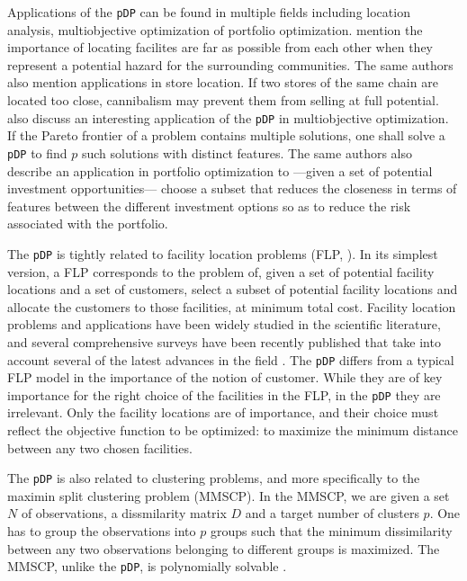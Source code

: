 \documentclass[a4paper,10pt]{article}
\newcommand{\pDP}{\texttt{pDP}}
\begin{document}
Applications of the \pDP{} can be found in multiple fields including location analysis, multiobjective optimization of portfolio optimization. \citet{Kuby1987Programming} mention the importance of locating facilites are far as possible from each other when they represent a potential hazard for the surrounding communities. The same authors also mention applications in store location. If two stores of the same chain are located too close, cannibalism may prevent them from selling at full potential. \citet{Saboonchi2014MaxMinMin} also discuss an interesting application of the \pDP{} in multiobjective optimization. If the Pareto frontier of a problem contains multiple solutions, one shall solve a \pDP{} to find $p$ such solutions with distinct features. The same authors also describe an application in portfolio optimization to ---given a set of potential investment opportunities--- choose a subset that reduces the closeness in terms of features between the different investment options so as to reduce the risk associated with the portfolio. 

The \pDP{} is tightly related to facility location problems (FLP, \citet{Laporte2015Location}). In its simplest version, a FLP corresponds to the problem of, given a set of potential facility locations and a set of customers, select a subset of potential facility locations and allocate the customers to those facilities, at minimum total cost. Facility location problems and applications have been widely studied in the scientific literature, and several comprehensive surveys have been recently published that take into account several of the latest advances in the field \citep{Laporte2015Location, Melo2009Facility}. The \pDP{} differs from a typical FLP model in the importance of the notion of customer. While they are of key importance for the right choice of the facilities in the FLP, in the \pDP{} they are irrelevant. Only the facility locations are of importance, and their choice must reflect the objective function to be optimized: to maximize the minimum distance between any two chosen facilities. 

The \pDP{} is also related to clustering problems, and more specifically to the maximin split clustering problem (MMSCP). In the MMSCP, we are given a set $N$ of observations, a dissmilarity matrix $D$ and a target number of clusters $p$. One has to group the observations into $p$ groups such that the minimum dissimilarity between any two observations belonging to different groups is maximized. The MMSCP, unlike the \pDP{}, is polynomially solvable \citep{Delattre1980Bicriterion}.
\end{document}
